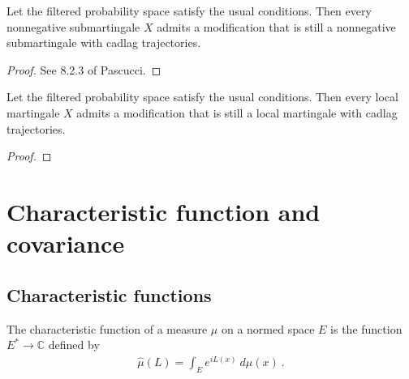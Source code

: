 

\begin{lemma}\label{lem:exists_cadlag_mod_of_nonneg_submg}
  Let the filtered probability space satisfy the usual conditions.
  Then every nonnegative submartingale $X$ admits a modification that is still a nonnegative submartingale with cadlag trajectories.
\end{lemma}

\begin{proof}
  See 8.2.3 of Pascucci.
\end{proof}


\begin{lemma}\label{lem:exists_cadlag_mod_of_local_mg}
  Let the filtered probability space satisfy the usual conditions.
  Then every local martingale $X$ admits a modification that is still a local martingale with cadlag trajectories.
\end{lemma}

\begin{proof}
\end{proof}


\chapter{Characteristic function and covariance}

\section{Characteristic functions}
\label{sec:characteristic_function}


\begin{definition}\label{def:charFunDual}
  \mathlibok
The characteristic function of a measure $\mu$ on a normed space $E$ is the function $E^* \to \mathbb{C}$ defined by
\begin{align*}
  \hat{\mu}(L) = \int_E e^{i L(x)} \: d\mu(x) \: .
\end{align*}
\end{definition}


